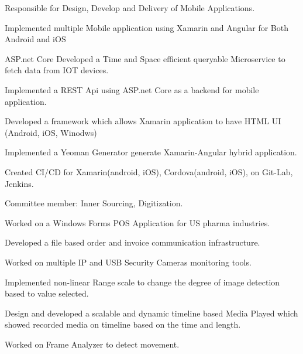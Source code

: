 \documentclass[]{shrikant-resume-openfont}
\begin{document}
\begin{minipage}[t]{0.66\textwidth}
\begin{tightemize}
\item Responsible for Design, Develop and Delivery of Mobile Applications.
\item Implemented multiple Mobile application using Xamarin and Angular for Both Android and iOS
\item ASP.net Core Developed a Time and Space efficient queryable Microservice to fetch data from IOT devices.
\item Implemented a REST Api using ASP.net Core as a backend for mobile application.
\item Developed a framework which allows Xamarin application to have HTML UI (Android, iOS, Winodws)
\item Implemented a Yeoman Generator generate Xamarin-Angular hybrid application.
\item Created CI/CD for Xamarin(android, iOS), Cordova(android, iOS), on Git-Lab, Jenkins.
\item Committee member: Inner Sourcing, Digitization.
\end{tightemize}
\sectionsep

\vspace{\topsep} %
\begin{tightemize}
\item Worked on a Windows Forms POS Application for US pharma industries.
\item Developed a file based order and invoice communication infrastructure.
\end{tightemize}
\sectionsep

\begin{tightemize}
\item Worked on multiple IP and USB Security Cameras monitoring tools.
\item Implemented non-linear Range scale to change the degree of image detection based to value selected.
\item Design and developed a scalable and dynamic timeline based Media Played which showed recorded media on timeline based on the time and length.
\item Worked on Frame Analyzer to detect movement.
\end{tightemize}
\sectionsep


\end{minipage}
\end{document}
